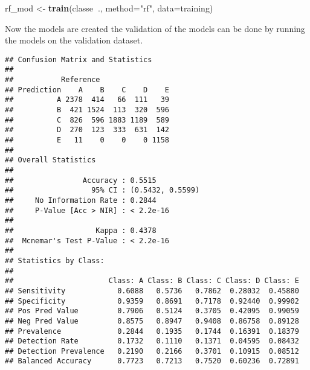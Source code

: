 \documentclass[]{article}
\newenvironment{Shaded}{\begin{snugshade}}{\end{snugshade}}
\newcommand{\KeywordTok}[1]{\textcolor[rgb]{0.13,0.29,0.53}{\textbf{#1}}}
\newcommand{\DataTypeTok}[1]{\textcolor[rgb]{0.13,0.29,0.53}{#1}}
\newcommand{\StringTok}[1]{\textcolor[rgb]{0.31,0.60,0.02}{#1}}
\newcommand{\OperatorTok}[1]{\textcolor[rgb]{0.81,0.36,0.00}{\textbf{#1}}}
\newcommand{\NormalTok}[1]{#1}
\begin{document}
\begin{Shaded}
\begin{Highlighting}[]
\NormalTok{rf_mod <-}\StringTok{ }\KeywordTok{train}\NormalTok{(classe}\OperatorTok{~}\NormalTok{., }\DataTypeTok{method=}\StringTok{"rf"}\NormalTok{, }\DataTypeTok{data=}\NormalTok{training)}
\end{Highlighting}
\end{Shaded}

Now the models are created the validation of the models can be done by
running the models on the validation dataset.

\begin{Shaded}
\end{Shaded}

\begin{verbatim}
## Confusion Matrix and Statistics
## 
##           Reference
## Prediction    A    B    C    D    E
##          A 2378  414   66  111   39
##          B  421 1524  113  320  596
##          C  826  596 1883 1189  589
##          D  270  123  333  631  142
##          E   11    0    0    0 1158
## 
## Overall Statistics
##                                           
##                Accuracy : 0.5515          
##                  95% CI : (0.5432, 0.5599)
##     No Information Rate : 0.2844          
##     P-Value [Acc > NIR] : < 2.2e-16       
##                                           
##                   Kappa : 0.4378          
##  Mcnemar's Test P-Value : < 2.2e-16       
## 
## Statistics by Class:
## 
##                      Class: A Class: B Class: C Class: D Class: E
## Sensitivity            0.6088   0.5736   0.7862  0.28032  0.45880
## Specificity            0.9359   0.8691   0.7178  0.92440  0.99902
## Pos Pred Value         0.7906   0.5124   0.3705  0.42095  0.99059
## Neg Pred Value         0.8575   0.8947   0.9408  0.86758  0.89128
## Prevalence             0.2844   0.1935   0.1744  0.16391  0.18379
## Detection Rate         0.1732   0.1110   0.1371  0.04595  0.08432
## Detection Prevalence   0.2190   0.2166   0.3701  0.10915  0.08512
## Balanced Accuracy      0.7723   0.7213   0.7520  0.60236  0.72891
\end{verbatim}

\begin{Shaded}
\end{Shaded}
\end{document}
